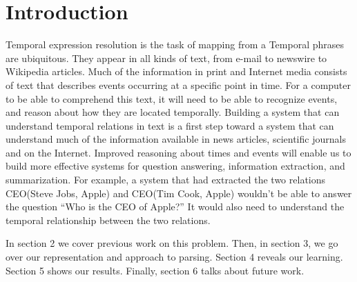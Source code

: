 \section{Introduction}
\label{sec:introduction}

Temporal expression resolution is the task of mapping from a 
Temporal phrases are ubiquitous. They appear in all kinds of text, from e-mail to newswire to Wikipedia articles. 
Much of the information in print and Internet media consists of text that describes events occurring at a specific point in time. For a computer to be able to comprehend this text, it will need to be able to recognize events, and reason about how they are located temporally. Building a system that can understand temporal relations in text is a first step toward a system that can understand much of the information available in news articles, scientific journals and on the Internet.
Improved reasoning about times and events will enable us to build more effective systems for question answering, information extraction, and summarization. For example, a system that had extracted the two relations CEO(Steve Jobs, Apple) and CEO(Tim Cook, Apple) wouldn’t be able to answer the question “Who is the CEO of Apple?” It would also need to understand the temporal relationship between the two relations.




In section 2 we cover previous work on this problem. Then, in section 3, we go over our representation and approach to parsing. Section 4 reveals our learning. Section 5 shows our results. Finally, section 6 talks about future work.


